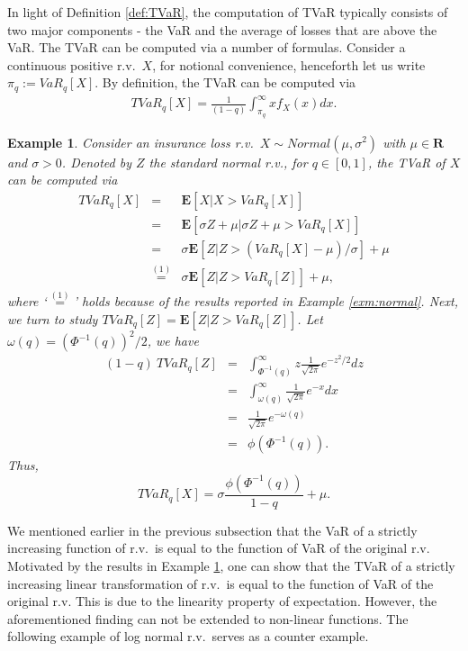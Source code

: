 \documentclass[12pt]{article}
\newtheorem{example}{\bf Example}
\begin{document}
In light of Definition \ref{def:TVaR}, the computation of TVaR typically consists of two major components - the VaR and the average of losses that are above the VaR. The TVaR can be computed via  a number of formulas. Consider a continuous positive r.v.\ $X$, for notional convenience, henceforth let us write $\pi_q:=VaR_q[X]$. By definition, the TVaR can be computed via
\begin{eqnarray}
\label{eqn:cte-pdf}
TVaR_{q}[X]=\frac{1}{(1-q)}\int_{\pi_q}^{\infty}xf_X(x)dx.
\end{eqnarray}
\begin{example}
\label{exm:cte-normal}
  Consider an insurance loss r.v.\ $X\sim Normal (\mu,\sigma^2)$ with $\mu\in \mathbf{R}$ and $\sigma>0$.  Denoted by $Z$ the standard normal r.v., for $q\in[0,1]$, the TVaR of $X$ can be computed via
\begin{eqnarray*}
  TVaR_q[X] &=& \mathbf{E}[X|X>VaR_q[X]]\\
&=&\mathbf{E}[\sigma Z+\mu|\sigma Z+\mu>VaR_q[X]]\\
&=& \sigma\mathbf{E}[Z|Z>(VaR_q[X]-\mu)/\sigma]+\mu\\
&\overset{(1)}{=}& \sigma\mathbf{E}[Z|Z>VaR_q[Z]]+\mu,
\end{eqnarray*}
where `$\overset{(1)}{=}$' holds because of the results reported in Example \ref{exm:normal}.  Next, we turn to study $TVaR_q[Z]=\mathbf{E}[Z|Z>VaR_q[Z]]$.  Let $\omega(q)=(\Phi^{-1}(q))^2/2$, we have
\begin{eqnarray*}
  (1-q)\ TVaR_q[Z] &=& \int_{\Phi^{-1}(q)}^{\infty} z \frac{1}{\sqrt{2\pi}} e^{-z^2/2}dz\\
&=& \int_{\omega(q)}^{\infty}  \frac{1}{\sqrt{2\pi}} e^{-x}dx\\
&=& \frac{1}{\sqrt{2\pi}} e^{-\omega(q)}\\
&=& \phi(\Phi^{-1}(q)).
\end{eqnarray*}
Thus,
\[
TVaR_q[X]=\sigma\frac{\phi(\Phi^{-1}(q))}{1-q}+\mu.
\]
\end{example}
We mentioned earlier in the previous subsection that the VaR of a strictly increasing function of r.v.\ is equal to the function of VaR of the original r.v.  Motivated by the results in Example \ref{exm:cte-normal}, one can show that the TVaR of a strictly increasing linear transformation of r.v.\ is equal to the function of VaR of the original r.v.  This is due to the linearity property of expectation.  However, the aforementioned  finding can not be extended to non-linear functions.  The following example of log normal r.v.\ serves as a counter example.
\end{document}
